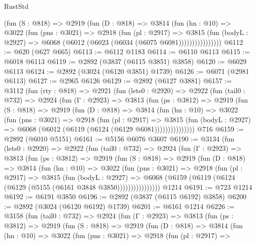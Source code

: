 \begin{lexlean}{RustStd}
\begin{coremodule}
                (fun (S : @818) =>
                @2919
                  (fun (D : @818) =>
                  @3814
                    (fun (hn : @10) =>
                    @3022
                      (fun (pns : @3021) =>
                      @2918
                        (fun (pl : @2917) =>
                        @3815
                          (fun (bodyL : @2927) =>
                          @6068 (@6012 (@6023 (@6034 (@6075 @6081))))))))))))))))
@6112 := @620 (@627 @665)
@6113 := @6112 @1183
@6114 := @6110 @6113
@6115 := @6018 @6113
@6119 := @2892 (@3837 (@6115 @3851) @3858)
@6120 := @6029 @6113
@6124 := @2892 (@3024 (@6120 @3851) @1739)
@6126 := @6071 (@2981 @6113)
@6127 := @2965 @6126
@6129 := @2892 (@6127 @3881)
@6157 := @3112
    (fun (rty : @818) =>
    @2921
      (fun (lets0 : @2920) =>
      @2922
        (fun (tail0 : @732) =>
        @2924
          (fun (Γ : @2923) =>
          @3813
            (fun (ps : @3812) =>
            @2919
              (fun (S : @818) =>
              @2919
                (fun (D : @818) =>
                @3814
                  (fun (hn : @10) =>
                  @3022
                    (fun (pns : @3021) =>
                    @2918
                      (fun (pl : @2917) =>
                      @3815
                        (fun (bodyL : @2927) =>
                        @6068 (@6012 (@6119 (@6124 (@6129 @6081)))))))))))))))
    @716
@6159 := @2892 (@6010 @5151)
@6161 := @5156 @6076 @3607
@6190 := @3134
    (fun (lets0 : @2920) =>
    @2922
      (fun (tail0 : @732) =>
      @2924
        (fun (Γ : @2923) =>
        @3813
          (fun (ps : @3812) =>
          @2919
            (fun (S : @818) =>
            @2919
              (fun (D : @818) =>
              @3814
                (fun (hn : @10) =>
                @3022
                  (fun (pns : @3021) =>
                  @2918
                    (fun (pl : @2917) =>
                    @3815
                      (fun (bodyL : @2927) =>
                      @6068 (@6159 (@6119 (@6124 (@6129 (@5155 (@6161 @3848 @3850))))))))))))))))
    @1214
@6191 := @723 @1214
@6192 := @6191 @3850
@6196 := @2892 (@3837 (@6115 @6192) @3858)
@6200 := @2892 (@3024 (@6120 @6192) @1739)
@6201 := @6161 @1214
@6226 := @3158
    (fun (tail0 : @732) =>
    @2924
      (fun (Γ : @2923) =>
      @3813
        (fun (ps : @3812) =>
        @2919
          (fun (S : @818) =>
          @2919
            (fun (D : @818) =>
            @3814
              (fun (hn : @10) =>
              @3022
                (fun (pns : @3021) =>
                @2918
                  (fun (pl : @2917) =>

\end{coremodule}
\end{lexlean}
